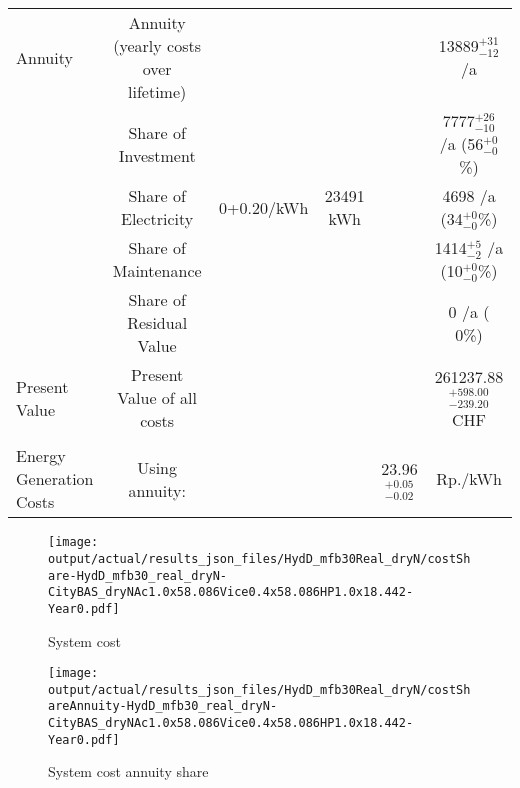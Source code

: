 \documentclass[english]{SPFShortReport}
\begin{document}
\begin{table}[!ht]
\begin{adjustbox}{max width =\textwidth}
\begin{tabular}{l | c c c c c }
Annuity & Annuity (yearly costs over lifetime)  &&& & 13889$^{\mathrm{+31}}_{\mathrm{-12}}$ /a  \\
 & Share of Investment & &&& 7777$^{\mathrm{+26}}_{\mathrm{-10}}$ /a (56$^{\mathrm{+ 0}}_{\mathrm{- 0}}$\%) \\
 & Share of Electricity & 0+0.20/kWh & 23491 kWh &  & 4698 /a (34$^{\mathrm{+ 0}}_{\mathrm{- 0}}$\%)\\
 & Share of Maintenance & &&& 1414$^{\mathrm{+ 5}}_{\mathrm{- 2}}$ /a (10$^{\mathrm{+ 0}}_{\mathrm{- 0}}$\%)\\ 
 & Share of Residual Value &&& &  0 /a ( 0\%)\\
Present Value  & Present Value of all costs  & &&& 261237.88$^{\mathrm{+598.00}}_{\mathrm{-239.20}}$ CHF \\
\hline \\ 
 Energy Generation Costs & Using annuity: &&& 23.96$^{\mathrm{+0.05}}_{\mathrm{-0.02}}$ & Rp./kWh \\
\hline
\hline
\end{tabular}
\end{adjustbox}
\label{CostsTable}
\end{table}
\begin{figure}[!htbp]
\begin{center}
\texttt{[image: output/actual/results\_json\_files/HydD\_mfb30Real\_dryN/costShare-HydD\_mfb30\_real\_dryN-CityBAS\_dryNAc1.0x58.086Vice0.4x58.086HP1.0x18.442-Year0.pdf]}
\caption{System cost}
\label{systemCost}
\end{center}
\end{figure}
\begin{figure}[!htbp]
\begin{center}
\texttt{[image: output/actual/results\_json\_files/HydD\_mfb30Real\_dryN/costShareAnnuity-HydD\_mfb30\_real\_dryN-CityBAS\_dryNAc1.0x58.086Vice0.4x58.086HP1.0x18.442-Year0.pdf]}
\caption{System cost annuity share}
\label{systemCostannuity}
\end{center}
\end{figure}
\end{document}

